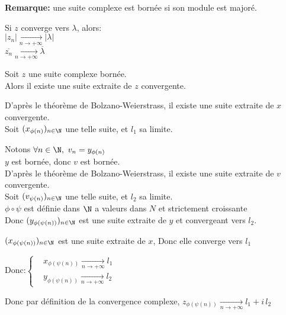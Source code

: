 \documentclass[12pt,twoside,a4paper]{article}
\begin{document}
		\begin{flushleft}
			\textbf{Remarque:} une suite complexe est born\'ee si son module est major\'e.
		\end{flushleft}
		\begin{prop}
			Si $z$ converge vers $\lambda$, alors:\\
			\textbullet $|z_n|\mathop{\longrightarrow}\limits_{n\rightarrow+\infty}|\lambda|$\\
			\textbullet $\overline{z_n}\mathop{\longrightarrow}\limits_{n\rightarrow+\infty}\overline{\lambda}$
		\end{prop}
		\begin{prop}
				Soit $z$ une suite complexe born\'ee.\\
				Alors il existe une suite extraite de $z$ convergente.
		\end{prop}
		\begin{preuve}
			\begin{liste}
				\item D'apr\`es le th\'eor\`eme de Bolzano-Weierstrass, il existe une suite extraite de $x$ convergente.\\
					Soit $(x_{\phi(n)})_{n\in\N}$ une telle suite, et $l_1$ sa limite.
				\item Notons $\forall n\in\N,\ v_n=y_{\phi(n)}$\\
					$y$ est born\'ee, donc $v$ est born\'ee.\\
					D'apr\`es le th\'eor\`eme de Bolzano-Weierstrass, il existe une suite extraite de $v$ convergente.\\
					Soit $(v_{\psi(n)})_{n\in\N}$ une telle suite, et $l_2$ sa limite.\\
					$\phi\circ\psi$ est d\'efinie dans $\N$ a valeurs dans $N$ et strictement croissante\\
					Donc $(y_{\phi(\psi(n))})_{n\in\N}$ est une suite extraite de $y$ et convergeant vers $l_2$.
				\item $(x_{\phi(\psi(n))})_{n\in\N}$ est une suite extraite de $x$,
					Donc elle converge vers $l_1$
				\item Donc:$\left\{\begin{aligned}& x_{\phi(\psi(n))} \mathop{\longrightarrow}\limits_{n\rightarrow+\infty} l_1\\ & y_{\phi(\psi(n))} \mathop{\longrightarrow}\limits_{n\rightarrow+\infty} l_2 \end{aligned}\right.$
			\end{liste}
			\begin{flushleft}
				Donc par d\'efinition de la convergence complexe, $z_{\phi(\psi(n))}\mathop{\longrightarrow}\limits_{n\rightarrow+\infty}l_1+i\,l_2$
			\end{flushleft}
		\end{preuve}
\end{document}

